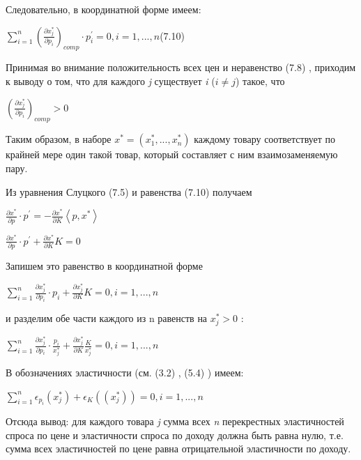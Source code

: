 \documentclass[12pt, 4paper]{book}
\begin{document}
{Следовательно, в координатной форме имеем: 
\begin{center}
$\sum\limits_{i=1}^{n}(\frac{\partial x_{j}^{*}}{\partial p_i})_{comp}\cdot p_{i}^{'}=0,i=1,...,n$(7.10)
\end{center}
\par

Принимая во внимание положительность всех цен и неравенство (7.8) , приходим к выводу о том, что для каждого \textit{j} существует \textit{i} ($i \neq j$) такое, что 
\begin{center}
$(\frac{\partial x_{j}^{*}}{\partial p_i})_{comp} > 0 $
\end{center}
\par

Таким образом, в наборе $x^{*}=(x_{1}^{*},...,x_{n}^{*})$ каждому товару соответствует по крайней мере один такой товар, который составляет с ним взаимозаменяемую пару. 
\par

Из уравнения Слуцкого (7.5) и равенства (7.10) получаем 
\begin{center}
$\frac{\partial x^{*}}{\partial p}\cdot p^{'} = -\frac{\partial x^{*}}{\partial K}\left\langle p,x^{*}\right\rangle$
\end{center}
\begin{center}
$\frac{\partial x^{*}}{\partial p}\cdot p^{'} + \frac{\partial x^{*}}{\partial K}K = 0$
\end{center}
\par

Запишем это равенство в координатной форме 
\begin{center}
$\sum\limits_{i=1}^{n}\frac{\partial x_{j}^{*}}{\partial p_i}\cdot p_i+ \frac{\partial x_{j}^{*}}{\partial K}K=0 , i=1,...,n$
\end{center}
и разделим обе части каждого из n равенств на $x_{j}^{*}>0$ : 
\begin{center}
$\sum\limits_{i=1}^{n}\frac{\partial x_{j}^{*}}{\partial p_i}\cdot \frac{p_i}{x_{j}^{*}}+ \frac{\partial x_{j}^{*}}{\partial K} \frac{K}{x_{j}^{*}}=0 , i=1,...,n$
\end{center}
\par

В обозначениях эластичности (см. (3.2) , (5.4) ) имеем: 
\begin{center}
$\sum\limits_{i=1}^{n} \epsilon_{p_{i}}(x_{j}^{*})+\epsilon_K((x_{j}^{*}))=0 ,i=1,...,n$
\end{center}
Отсюда вывод: для каждого товара \textit{j} сумма всех \textit{n} перекрестных эластичностей спроса по цене и эластичности спроса по доходу должна быть равна нулю, т.е. сумма всех эластичностей по цене равна отрицательной эластичности по доходу. 
\par

}
\end{document}
